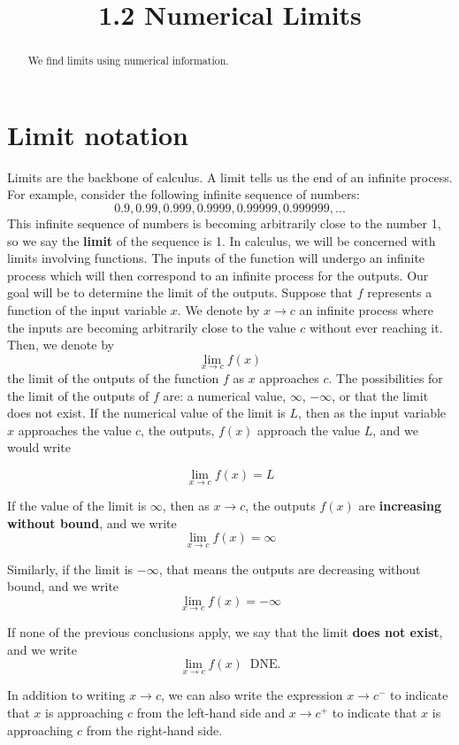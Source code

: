 \documentclass[handout]{ximera}
\title{1.2 Numerical Limits}
\begin{document}
\begin{abstract}
We find limits using numerical information.
\end{abstract}

\maketitle


\section{Limit notation}

Limits are the backbone of calculus. A limit tells us the end of an infinite process. For example, consider the following infinite sequence of numbers:
\[ 0.9, 0.99, 0.999, 0.9999, 0.99999, 0.999999, ... \]
This infinite sequence of numbers is becoming arbitrarily close to the number 1, so we say the \textbf{limit} of the sequence is 1.
In calculus, we will be concerned with limits involving functions.
The inputs of the function will undergo an infinite process which will then correspond to an infinite process for the outputs.  
Our goal will be to determine the limit of the outputs.
Suppose that $f$ represents a function of the input variable $x$.
We denote by $x \to c$ an infinite process where the inputs are becoming arbitrarily close to the value $c$ without ever reaching it.
Then, we denote by
\[ \lim_{x\to c} f(x) \]
the limit of the outputs of the function $f$ as $x$ approaches $c$.
The possibilities for the limit of the outputs of $f$ are: a numerical value, 
$\infty$, $-\infty$, or that the limit does not exist.
If the numerical value of the limit is $L$, then as the input variable $x$ approaches the value $c$, the outputs, $f(x)$ approach the value $L$, and we would write

\[ 
\lim_{x\to c} f(x) = L
\]

If the value of the limit is $\infty$, then as $x \to c$, the outputs $f(x)$ are \textbf{increasing without bound},
and we write
\[
\lim_{x \to c} f(x) = \infty
\]
  
Similarly, if the limit is $-\infty$, that means the outputs are decreasing without bound, and we write
\[
\lim_{x \to c} f(x) = -\infty
\]

If none of the previous conclusions apply, we say that the limit \textbf{does not exist}, and we write
\[
\lim_{x \to c} f(x) \;\; \text{DNE}.
\] 

In addition to writing $x \to c$, we can also write the expression
$x \to c^-$ to indicate that $x$ is approaching $c$ from the left-hand side and $x \to c^+$ to 
indicate that $x$ is approaching $c$ from the right-hand side.
\end{document}
